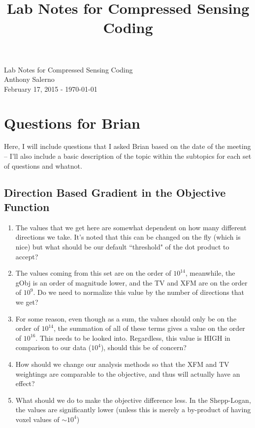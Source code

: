 \documentclass[11 pt]{article}
\title{Lab Notes for Compressed Sensing Coding}
\let\oldsection\section
\renewcommand\section{\clearpage\newpage\oldsection}
\begin{document}
\vfill

  \begin{titlepage}
    \vspace*{\fill}
    \begin{center}
      {\huge {Lab Notes for Compressed Sensing Coding}}\\[0.5cm]
      {\large {Anthony Salerno}}\\[0.4cm]
      February 17, 2015 - \today
    \end{center}
    \vspace*{\fill}
  \end{titlepage}

\clearpage
\newpage

\tableofcontents

\newpage

\section{Questions for Brian}
  Here, I will include questions that I asked Brian based on the date of the meeting -- I'll also include a basic description of the topic within the subtopics for each set of questions and whatnot.

  \subsection{Direction Based Gradient in the Objective Function}
    \begin{enumerate}
      \item The values that we get here are somewhat dependent on how many different directions we take. It's noted that this can be changed on the fly (which is nice) but what should be our default ``threshold" of the dot product to accept?

      \item The values coming from this set are on the order of $10^{14}$, meanwhile, the gObj is an order of magnitude lower, and the TV and XFM are on the order of $10^9$. Do we need to normalize this value by the number of directions that we get?

      \item For some reason, even though as a sum, the values should only be on the order of $10^{14}$, the summation of all of these terms gives a value on the order of $10^{16}$. This needs to be looked into. Regardless, this value is HIGH in comparison to our data ($10^4$), should this be of concern?

      \item How should we change our analysis methods so that the XFM and TV weightings are comparable to the objective, and thus will actually have an effect?

      \item What should we do to make the objective difference less. In the Shepp-Logan, the values are significantly lower (unless this is merely a by-product of having voxel values of $\sim10^4$)
      \end{enumerate}
\end{document}
